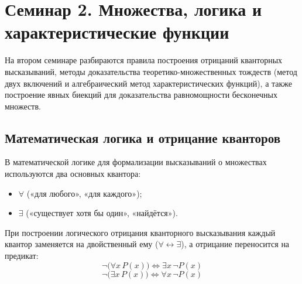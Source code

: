 \section{Семинар 2. Множества, логика и характеристические функции}

\begin{remark}
    На втором семинаре разбираются правила построения отрицаний 
    кванторных высказываний, методы доказательства теоретико-множественных 
    тождеств (метод двух включений и алгебраический метод 
    характеристических функций), а также построение явных биекций для 
    доказательства равномощности бесконечных множеств.
\end{remark}

\subsection{Математическая логика и отрицание кванторов}

\begin{definition}
    В математической логике для формализации высказываний о множествах 
    используются два основных квантора:
    \begin{itemize}
        \item {} $\forall$ («для любого», 
        «для каждого»);
        \item {} $\exists$ («существует хотя 
        бы один», «найдётся»).
    \end{itemize}
\end{definition}

\begin{properties}
    При построении логического отрицания кванторного высказывания 
    каждый квантор заменяется на двойственный ему ($\forall \leftrightarrow 
    \exists$), а отрицание переносится на предикат:
    \begin{equation} \label{eq:quant_neg_all}
        \neg \bigl(\forall x \, P(x)\bigr) \iff \exists x \, \neg P(x) \tag{1}
    \end{equation}
    \begin{equation} \label{eq:quant_neg_ex}
        \neg \bigl(\exists x \, P(x)\bigr) \iff \forall x \, \neg P(x) \tag{2}
    \end{equation}
\end{properties}


